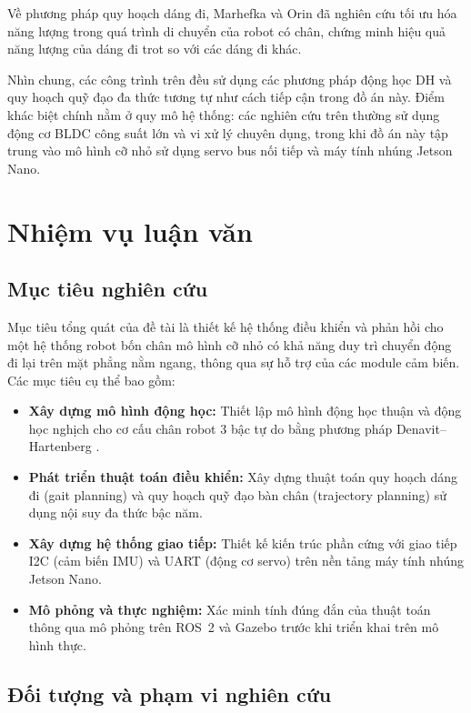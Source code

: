 Về phương pháp quy hoạch dáng đi, Marhefka và Orin \cite{marhefka1999} đã nghiên cứu tối ưu hóa năng lượng trong quá trình di chuyển của robot có chân, chứng minh hiệu quả năng lượng của dáng đi trot so với các dáng đi khác.

Nhìn chung, các công trình trên đều sử dụng các phương pháp động học DH \cite{denavit1955} và quy hoạch quỹ đạo đa thức tương tự như cách tiếp cận trong đồ án này. Điểm khác biệt chính nằm ở quy mô hệ thống: các nghiên cứu trên thường sử dụng động cơ BLDC công suất lớn và vi xử lý chuyên dụng, trong khi đồ án này tập trung vào mô hình cỡ nhỏ sử dụng servo bus nối tiếp và máy tính nhúng Jetson Nano.



\section{Nhiệm vụ luận văn}

\subsection{Mục tiêu nghiên cứu}

Mục tiêu tổng quát của đề tài là thiết kế hệ thống điều khiển và phản hồi cho một hệ thống robot bốn chân mô hình cỡ nhỏ có khả năng duy trì chuyển động đi lại trên mặt phẳng nằm ngang, thông qua sự hỗ trợ của các module cảm biến. Các mục tiêu cụ thể bao gồm:

\begin{itemize}
    \item \textbf{Xây dựng mô hình động học:} Thiết lập mô hình động học thuận và động học nghịch cho cơ cấu chân robot 3 bậc tự do bằng phương pháp Denavit--Hartenberg \cite{denavit1955}.
    \item \textbf{Phát triển thuật toán điều khiển:} Xây dựng thuật toán quy hoạch dáng đi (gait planning) và quy hoạch quỹ đạo bàn chân (trajectory planning) sử dụng nội suy đa thức bậc năm.
    \item \textbf{Xây dựng hệ thống giao tiếp:} Thiết kế kiến trúc phần cứng với giao tiếp I2C (cảm biến IMU) và UART (động cơ servo) trên nền tảng máy tính nhúng Jetson Nano.
    \item \textbf{Mô phỏng và thực nghiệm:} Xác minh tính đúng đắn của thuật toán thông qua mô phỏng trên ROS~2 và Gazebo trước khi triển khai trên mô hình thực.
\end{itemize}

\subsection{Đối tượng và phạm vi nghiên cứu}

